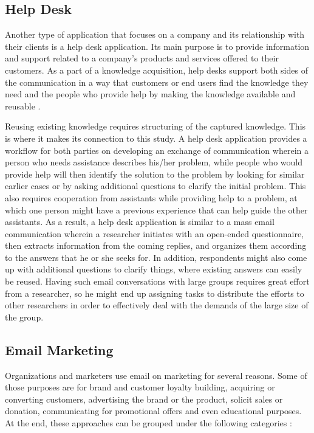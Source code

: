\subsection{Help Desk}
\label{subsec:3.1.2:HelpDeskSoft}
Another type of application that focuses on a company and its relationship with their clients is a help desk application. Its main purpose is to provide information and support related to a company's products and services offered to their customers. As a part of a knowledge acquisition, help desks support both sides of the communication in a way that customers or end users find the knowledge they need and the people who provide help by making the knowledge available and reusable \citep{Halverson2004}.
\vspace{1cm}

Reusing existing knowledge requires structuring of the captured knowledge. This is where it makes its connection to this study. A help desk application provides a workflow for both parties on developing an exchange of communication wherein a person who needs assistance describes his/her problem, while people who would provide help will then identify the solution to the problem by looking for similar earlier cases or by asking additional questions to clarify the initial problem. This also requires cooperation from assistants while providing help to a problem, at which one person might have a previous experience that can help guide the other assistants. As a result, a help desk application is similar to a mass email communication wherein a researcher initiates with an open-ended questionnaire, then extracts information from the coming replies, and organizes them according to the answers that he or she seeks for. In addition, respondents might also come up with additional questions to clarify things, where existing answers can easily be reused. Having such email conversations with large groups requires great effort from a researcher, so he might end up assigning tasks to distribute the efforts to other researchers in order to effectively deal with the demands of the large size of the group.


\subsection{Email Marketing}
\label{subsec:3.1.3:EmaiMarkt}
Organizations and marketers use email on marketing for several reasons. Some of those purposes are for brand and customer loyalty building, acquiring or converting customers, advertising the brand or the product, solicit sales or donation, communicating for promotional offers and even educational purposes. At the end, these approaches can be grouped under the following categories \citep{Eley2009}:

